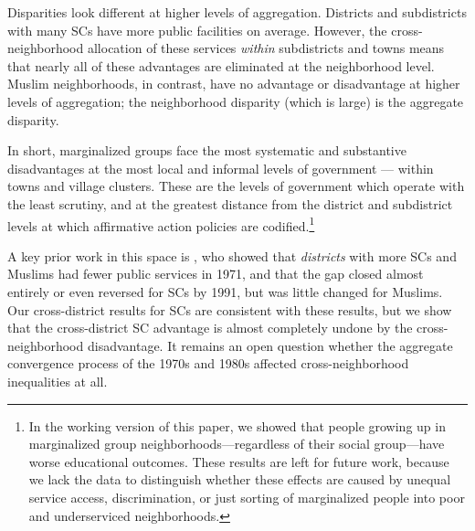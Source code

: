 \documentclass[12pt]{article}
\begin{document}
Disparities look different at higher levels of aggregation. Districts and subdistricts with many SCs have more public facilities on average. However, the cross-neighborhood allocation of these services \textit{within} subdistricts and towns means that nearly all of these advantages are eliminated at the neighborhood level. Muslim neighborhoods, in contrast, have no advantage or disadvantage at higher levels of aggregation; the neighborhood disparity (which is large) is the aggregate disparity.

In short, marginalized groups face the most systematic and substantive disadvantages at the most local and informal levels of government --- within towns and village clusters. These are the levels of government which operate with the least scrutiny, and at the greatest distance from the district and subdistrict levels at which affirmative action policies are codified.\footnote{In the working version of this paper, we showed that people growing up in marginalized group neighborhoods---regardless of their social group---have worse educational outcomes. These results are left for future work, because we lack the data to distinguish whether these effects are caused by unequal service access, discrimination, or just sorting of marginalized people into poor and underserviced neighborhoods.}

A key prior work in this space is \citet{banerjee2007}, who showed that \textit{districts} with more SCs and Muslims had fewer public services in 1971, and that the gap closed almost entirely or even reversed for SCs by 1991, but was little changed for Muslims. Our cross-district results for SCs are consistent with these results, but we show that the cross-district SC advantage is almost completely undone by the cross-neighborhood disadvantage. It remains an open question whether the aggregate convergence process of the 1970s and 1980s affected cross-neighborhood inequalities at all.
\end{document}
